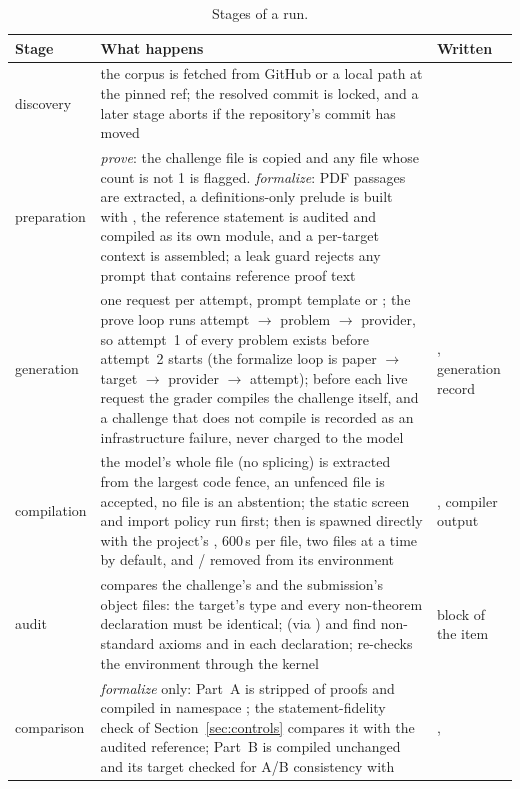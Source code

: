 \documentclass[11pt,a4paper]{article}
\begin{document}
\begin{table}[htbp]
\centering\small
\caption{Stages of a run.}
\label{tab:stages}
\begin{tabular}{L{20mm}L{96mm}L{36mm}}
\toprule
Stage & What happens & Written \\
\midrule
discovery & the corpus is fetched from GitHub or a local path at the pinned ref; the resolved commit is locked, and a later stage aborts if the repository's commit has moved &  \\
preparation & \emph{prove}: the challenge file  is copied and any file whose  count is not 1 is flagged. \emph{formalize}: PDF passages are extracted, a definitions-only prelude is built with , the reference statement is audited and compiled as its own module, and a per-target context is assembled; a leak guard rejects any prompt that contains reference proof text &  \\
generation & one request per attempt, prompt template  or ; the prove loop runs attempt $\to$ problem $\to$ provider, so attempt~1 of every problem exists before attempt~2 starts (the formalize loop is paper $\to$ target $\to$ provider $\to$ attempt); before each live request the grader compiles the challenge itself, and a challenge that does not compile is recorded as an infrastructure failure, never charged to the model & , generation record \\
compilation & the model's whole file (no splicing) is extracted from the largest  code fence, an unfenced file is accepted, no file is an abstention; the static screen and import policy run first; then  is spawned directly with the project's , 600\,s per file, two files at a time by default, and / removed from its environment & , compiler output \\
audit &  compares the challenge's and the submission's object files: the target's type and every non-theorem declaration must be identical;  (via ) and  find non-standard axioms and  in each declaration;  re-checks the environment through the kernel &  block of the item \\
comparison & \emph{formalize} only: Part~A is stripped of proofs and compiled in namespace ; the statement-fidelity check of Section~\ref{sec:controls} compares it with the audited reference; Part~B is compiled unchanged and its target checked for A/B consistency with  & ,  \\

\end{tabular}
\end{table}
\end{document}
